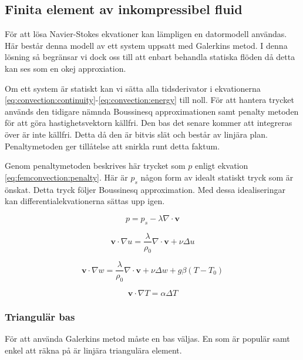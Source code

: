 \subsection{Finita element av inkompressibel fluid}

För att lösa Navier-Stokes ekvationer kan lämpligen en datormodell användas.
Här består denna modell av ett system uppsatt med Galerkins metod.
I denna lösning så begränsar vi dock oss till att enbart behandla statiska flöden
då detta kan ses som en okej approxiation.

Om ett system är statiskt kan vi sätta alla tidsderivator i ekvationerna
\eqref{eq:convection:continuity}-\eqref{eq:convection:energy} till noll.
För att hantera trycket används den tidigare nämnda Boussinesq approximationen
samt penalty metoden för att göra hastighetsvektorn källfri. Den bas det
senare kommer att integreras över är inte källfri. Detta då den är bitvis
slät och består av linjära plan. Penaltymetoden ger tillåtelse att snirkla
runt detta faktum.

Genom penaltymetoden beskrives här trycket som $p$ enligt ekvation
\eqref{eq:femconvection:penalty}. Här är $p_s$ någon form av idealt statiskt
tryck som är önskat. Detta tryck följer Boussinesq approximation. Med dessa
idealiseringar kan differentialekvationerna sättas upp igen. \cite{heinrich88}

\begin{equation}
\label{eq:femconvection:penalty}
p = p_s - \lambda\nabla\cdot\mathbf{v}
\end{equation}


\begin{equation}
\label{eq:femconvection:u}
\mathbf{v}\cdot\nabla u =
\frac{\lambda}{\rho_0}\nabla\cdot\mathbf{v} +
\nu\Delta u
\end{equation}

\begin{equation}
\label{eq:femconvection:w}
\mathbf{v}\cdot\nabla w =
\frac{\lambda}{\rho_0}\nabla\cdot\mathbf{v} + \nu\Delta w +g\beta(T-T_0)
\end{equation}

\begin{equation}
\label{eq:femconvection:T}
\mathbf{v}\cdot\nabla T = \alpha\Delta T
\end{equation}


\subsubsection{Triangulär bas}
För att använda Galerkins metod måste en bas väljas. En som är populär samt
enkel att räkna på är linjära triangulära element. 
